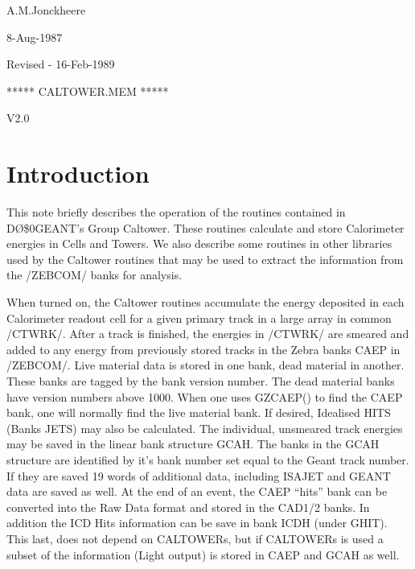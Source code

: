 %
%
%
%
%
%

%
\def\D0{D\O}


%
\begin{flushright}
A.M.Jonckheere

8-Aug-1987

Revised - 16-Feb-1989
\end{flushright}
\vspace{1.0in}
\centerline{***** CALTOWER.MEM *****}
\centerline{ V2.0 }

\section{Introduction}

This note briefly describes the operation of the routines contained in
\D0\$\D0GEANT's Group Caltower. These routines calculate and store Calorimeter
energies in Cells and Towers. We also describe some routines in other libraries
used by the Caltower routines that may be used to extract the information
from the /ZEBCOM/ banks for analysis.

When turned on, the Caltower routines accumulate the energy deposited in each
Calorimeter readout cell for a given primary track in a large array in
common /CTWRK/. After a track is finished, the energies in /CTWRK/ are smeared
and added to any energy from previously stored tracks in the Zebra banks CAEP in
/ZEBCOM/. Live material data is stored in one bank, dead material in another.
These banks are tagged by the bank version number. The dead material banks have
version numbers above 1000. When one uses GZCAEP() to find the CAEP bank, one
will normally find the live material bank. If desired, Idealised HITS (Banks
JETS) may also be calculated. The individual, unsmeared track energies may be
saved in the linear bank structure GCAH. The banks in the GCAH structure are
identified by it's bank number set equal to the Geant track number. If they are
saved 19 words of additional data, including ISAJET and GEANT data are saved as
well. At the end of an event, the CAEP ``hits'' bank can be converted into the Raw
Data format and stored in the CAD1/2 banks. In addition the ICD Hits information
can be save in bank ICDH (under GHIT). This last, does not depend on
CALTOWERs, but if CALTOWERs is used a subset of the information (Light output)
is stored in CAEP and GCAH as well.

